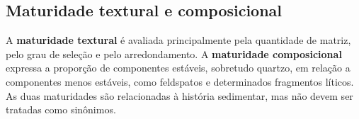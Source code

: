 \subsection{Maturidade textural e composicional}

A \textbf{maturidade textural} é avaliada principalmente pela quantidade de matriz, pelo
grau de seleção e pelo arredondamento. A \textbf{maturidade composicional} expressa a
proporção de componentes estáveis, sobretudo quartzo, em relação a componentes menos
estáveis, como feldspatos e determinados fragmentos líticos. As duas maturidades são
relacionadas à história sedimentar, mas não devem ser tratadas como sinônimos.
